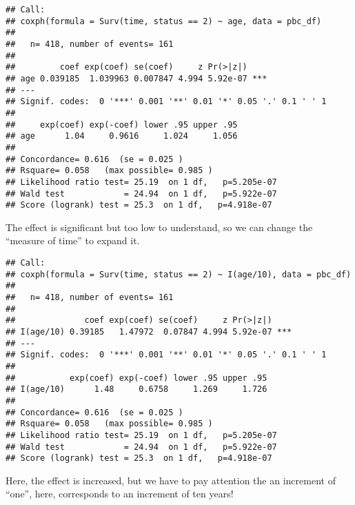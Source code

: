 \documentclass[]{book}
\newenvironment{Shaded}{\begin{snugshade}}{\end{snugshade}}
\newcommand{\KeywordTok}[1]{\textcolor[rgb]{0.13,0.29,0.53}{\textbf{{#1}}}}
\newcommand{\DataTypeTok}[1]{\textcolor[rgb]{0.13,0.29,0.53}{{#1}}}
\newcommand{\DecValTok}[1]{\textcolor[rgb]{0.00,0.00,0.81}{{#1}}}
\newcommand{\StringTok}[1]{\textcolor[rgb]{0.31,0.60,0.02}{{#1}}}
\newcommand{\CommentTok}[1]{\textcolor[rgb]{0.56,0.35,0.01}{\textit{{#1}}}}
\newcommand{\OtherTok}[1]{\textcolor[rgb]{0.56,0.35,0.01}{{#1}}}
\newcommand{\NormalTok}[1]{{#1}}
\theoremstyle{definition}
\theoremstyle{definition}
\theoremstyle{definition}
\theoremstyle{remark}
\begin{document}
\begin{verbatim}
## Call:
## coxph(formula = Surv(time, status == 2) ~ age, data = pbc_df)
## 
##   n= 418, number of events= 161 
## 
##         coef exp(coef) se(coef)     z Pr(>|z|)    
## age 0.039185  1.039963 0.007847 4.994 5.92e-07 ***
## ---
## Signif. codes:  0 '***' 0.001 '**' 0.01 '*' 0.05 '.' 0.1 ' ' 1
## 
##     exp(coef) exp(-coef) lower .95 upper .95
## age      1.04     0.9616     1.024     1.056
## 
## Concordance= 0.616  (se = 0.025 )
## Rsquare= 0.058   (max possible= 0.985 )
## Likelihood ratio test= 25.19  on 1 df,   p=5.205e-07
## Wald test            = 24.94  on 1 df,   p=5.922e-07
## Score (logrank) test = 25.3  on 1 df,   p=4.918e-07
\end{verbatim}

The effect is significant but too low to understand, so we can change
the ``measure of time'' to expand it.

\begin{Shaded}
\end{Shaded}

\begin{verbatim}
## Call:
## coxph(formula = Surv(time, status == 2) ~ I(age/10), data = pbc_df)
## 
##   n= 418, number of events= 161 
## 
##              coef exp(coef) se(coef)     z Pr(>|z|)    
## I(age/10) 0.39185   1.47972  0.07847 4.994 5.92e-07 ***
## ---
## Signif. codes:  0 '***' 0.001 '**' 0.01 '*' 0.05 '.' 0.1 ' ' 1
## 
##           exp(coef) exp(-coef) lower .95 upper .95
## I(age/10)      1.48     0.6758     1.269     1.726
## 
## Concordance= 0.616  (se = 0.025 )
## Rsquare= 0.058   (max possible= 0.985 )
## Likelihood ratio test= 25.19  on 1 df,   p=5.205e-07
## Wald test            = 24.94  on 1 df,   p=5.922e-07
## Score (logrank) test = 25.3  on 1 df,   p=4.918e-07
\end{verbatim}

Here, the effect is increased, but we have to pay attention the an
increment of ``one'', here, corresponds to an increment of ten years!

\begin{Shaded}
\end{Shaded}
\end{document}
